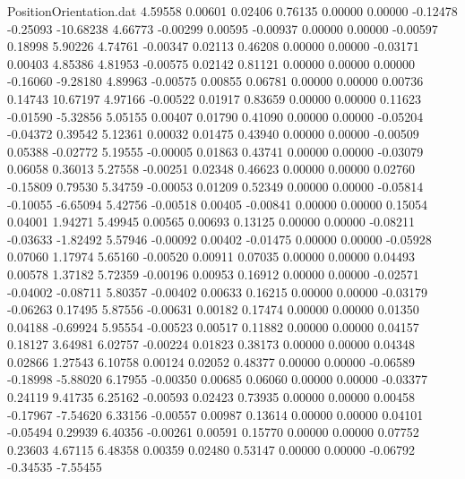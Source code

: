 \begin{filecontents}{PositionOrientation.dat}
   4.59558    0.00601    0.02406     0.76135    0.00000    0.00000   -0.12478   -0.25093  -10.68238
   4.66773   -0.00299    0.00595    -0.00937    0.00000    0.00000   -0.00597    0.18998    5.90226
   4.74761   -0.00347    0.02113     0.46208    0.00000    0.00000   -0.03171    0.00403    4.85386
   4.81953   -0.00575    0.02142     0.81121    0.00000    0.00000    0.00000   -0.16060   -9.28180
   4.89963   -0.00575    0.00855     0.06781    0.00000    0.00000    0.00736    0.14743   10.67197
   4.97166   -0.00522    0.01917     0.83659    0.00000    0.00000    0.11623   -0.01590   -5.32856
   5.05155    0.00407    0.01790     0.41090    0.00000    0.00000   -0.05204   -0.04372    0.39542
   5.12361    0.00032    0.01475     0.43940    0.00000    0.00000   -0.00509    0.05388   -0.02772
   5.19555   -0.00005    0.01863     0.43741    0.00000    0.00000   -0.03079    0.06058    0.36013
   5.27558   -0.00251    0.02348     0.46623    0.00000    0.00000    0.02760   -0.15809    0.79530
   5.34759   -0.00053    0.01209     0.52349    0.00000    0.00000   -0.05814   -0.10055   -6.65094
   5.42756   -0.00518    0.00405    -0.00841    0.00000    0.00000    0.15054    0.04001    1.94271
   5.49945    0.00565    0.00693     0.13125    0.00000    0.00000   -0.08211   -0.03633   -1.82492
   5.57946   -0.00092    0.00402    -0.01475    0.00000    0.00000   -0.05928    0.07060    1.17974
   5.65160   -0.00520    0.00911     0.07035    0.00000    0.00000    0.04493    0.00578    1.37182
   5.72359   -0.00196    0.00953     0.16912    0.00000    0.00000   -0.02571   -0.04002   -0.08711
   5.80357   -0.00402    0.00633     0.16215    0.00000    0.00000   -0.03179   -0.06263    0.17495
   5.87556   -0.00631    0.00182     0.17474    0.00000    0.00000    0.01350    0.04188   -0.69924
   5.95554   -0.00523    0.00517     0.11882    0.00000    0.00000    0.04157    0.18127    3.64981
   6.02757   -0.00224    0.01823     0.38173    0.00000    0.00000    0.04348    0.02866    1.27543
   6.10758    0.00124    0.02052     0.48377    0.00000    0.00000   -0.06589   -0.18998   -5.88020
   6.17955   -0.00350    0.00685     0.06060    0.00000    0.00000   -0.03377    0.24119    9.41735
   6.25162   -0.00593    0.02423     0.73935    0.00000    0.00000    0.00458   -0.17967   -7.54620
   6.33156   -0.00557    0.00987     0.13614    0.00000    0.00000    0.04101   -0.05494    0.29939
   6.40356   -0.00261    0.00591     0.15770    0.00000    0.00000    0.07752    0.23603    4.67115
   6.48358    0.00359    0.02480     0.53147    0.00000    0.00000   -0.06792   -0.34535   -7.55455

\end{filecontents}
